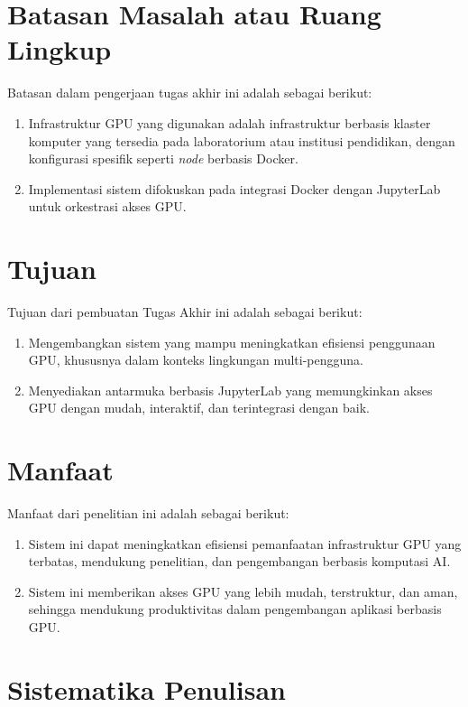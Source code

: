 \section{Batasan Masalah atau Ruang Lingkup}
Batasan dalam pengerjaan tugas akhir ini adalah sebagai berikut:
\begin{enumerate}
\item Infrastruktur GPU yang digunakan adalah infrastruktur berbasis klaster komputer yang tersedia pada laboratorium atau institusi pendidikan, dengan konfigurasi spesifik seperti \textit{node} berbasis Docker.
\item Implementasi sistem difokuskan pada integrasi Docker dengan JupyterLab untuk orkestrasi akses GPU.
\end{enumerate}

\section{Tujuan}

Tujuan dari pembuatan Tugas Akhir ini adalah sebagai berikut:
\begin{enumerate}
\item Mengembangkan sistem yang mampu meningkatkan efisiensi penggunaan GPU, khususnya dalam konteks lingkungan multi-pengguna.
\item Menyediakan antarmuka berbasis JupyterLab yang memungkinkan akses GPU dengan mudah, interaktif, dan terintegrasi dengan baik.
\end{enumerate}

\section{Manfaat}

Manfaat dari penelitian ini adalah sebagai berikut:
\begin{enumerate}
\item Sistem ini dapat meningkatkan efisiensi pemanfaatan infrastruktur GPU yang terbatas, mendukung penelitian, dan pengembangan berbasis komputasi AI.
\item Sistem ini memberikan akses GPU yang lebih mudah, terstruktur, dan aman, sehingga mendukung produktivitas dalam pengembangan aplikasi berbasis GPU.
\end{enumerate}

\section{Sistematika Penulisan}
\label{sec:sistematikapenulisan}

